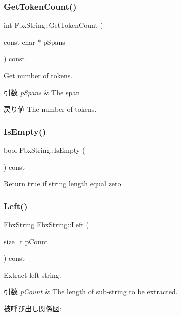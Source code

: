 \subsubsection{\texorpdfstring{Get\+Token\+Count()}{GetTokenCount()}}
{\footnotesize\ttfamily int Fbx\+String\+::\+Get\+Token\+Count (\begin{DoxyParamCaption}\item[{const char $\ast$}]{p\+Spans }\end{DoxyParamCaption}) const}

Get number of tokens. 
\begin{DoxyParams}{引数}
{\em p\+Spans} & The span \\
\hline
\end{DoxyParams}
\begin{DoxyReturn}{戻り値}
The number of tokens. 
\end{DoxyReturn}
\mbox{\label{class_fbx_string_af765fdc2a9878ae3474839ac6f6db525}} 
\subsubsection{\texorpdfstring{Is\+Empty()}{IsEmpty()}}
{\footnotesize\ttfamily bool Fbx\+String\+::\+Is\+Empty (\begin{DoxyParamCaption}{ }\end{DoxyParamCaption}) const}



Return {\ttfamily true} if string length equal zero. 

\mbox{\label{class_fbx_string_a61c3156aa112a9b2a2eba59b37db1feb}} 
\subsubsection{\texorpdfstring{Left()}{Left()}}
{\footnotesize\ttfamily \hyperlink{class_fbx_string}{Fbx\+String} Fbx\+String\+::\+Left (\begin{DoxyParamCaption}\item[{size\+\_\+t}]{p\+Count }\end{DoxyParamCaption}) const}

Extract left string. 
\begin{DoxyParams}{引数}
{\em p\+Count} & The length of sub-\/string to be extracted. \\
\hline
\end{DoxyParams}
被呼び出し関係図\+:
\mbox{\label{class_fbx_string_ad4ee2f69df02ceb7614910cf32b04653}} 

